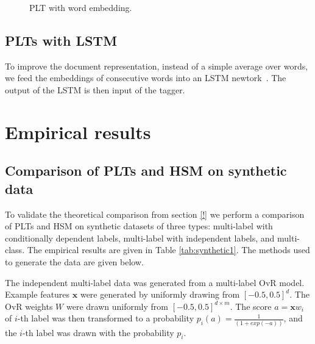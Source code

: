 \documentclass{article}
\renewcommand{\vec}[1]{\boldsymbol{#1}}
\newcommand{\bx}{\vec{x}}
\newcommand{\sectionBefore}{-0pt}
\newcommand{\sectionAfter}{-0pt}
\begin{document}
\begin{figure}
	\begin{center}
		
	\end{center}
	\caption{PLT with word embedding.}
	\label{pic:model-embedding}
\end{figure}



\vspace{\sectionBefore}
\subsection{PLTs with LSTM}
\label{sec:sparse_input}
\vspace{\sectionAfter}

To improve the document representation, instead of a simple average over words, we feed the embeddings of consecutive words into an LSTM newtork~\citep{!}. The output of the LSTM is then input of the tagger.

\vspace{\sectionBefore}
\section{Empirical results}
\label{sec:empirical_results}
\vspace{\sectionAfter}


\subsection{Comparison of PLTs and HSM on synthetic data}
\label{sec:empirical-synthetic}

To validate the theoretical comparison from section \ref{!} we perform a comparison of PLTs and HSM on synthetic datasets of three types: multi-label with conditionally dependent labels, multi-label with independent labels, and multi-class. The empirical results are given in Table \ref{tab:synthetic1}. The methods used to generate the data are given below.

The independent multi-label data was generated from a multi-label OvR \cite{!} model. Example features $\bx$ were generated by uniformly drawing from $[-0.5, 0.5]^d$. The OvR weights $W$ were drawn uniformly from  $[-0.5, 0.5]^{d \times m}$.
The score $a =\bx w_i$ of $i$-th label was then transformed to a probability $p_i(a) = \frac{1}{(1 + exp(-a))}$, and the $i$-th label was drawn with the probability $p_i$.
\end{document}
